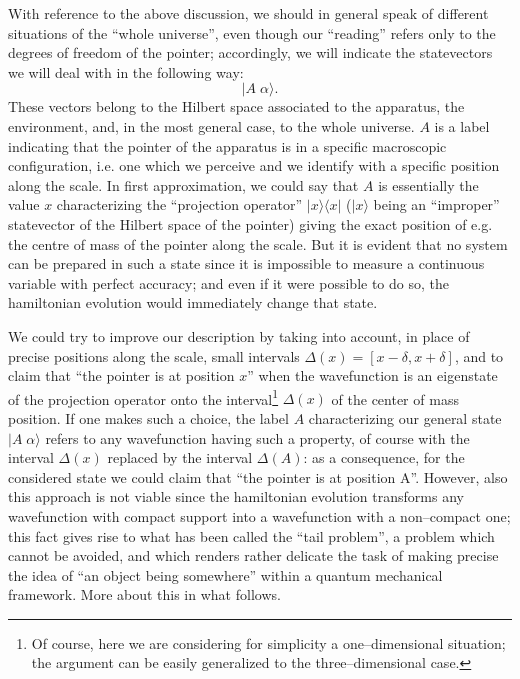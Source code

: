 \documentclass[10pt,a4paper]{article}
\begin{document}
With reference to the above discussion, we should in general speak
of different situations of the ``whole universe'', even though our
``reading'' refers only to the degrees of freedom of the  pointer;
accordingly, we will indicate the statevectors we will deal with
in the following way:
\[
        |A\; \alpha\rangle.
\]
These vectors belong to the Hilbert space  associated to the
apparatus,  the environment, and, in the most general case, to the
whole universe. $A$ is a label indicating that the pointer of the
apparatus is in a specific macroscopic configuration, i.e. one
which we perceive and we identify with a  specific position along
the scale. In first  approximation, we could say that $A$ is
essentially the value $x$  characterizing the ``projection
operator'' $|x\rangle\langle x|$ ($|x\rangle$ being an
``improper'' statevector of the Hilbert space of the pointer)
giving the exact  position of e.g. the centre of mass of the
pointer along the scale. But it is evident that no system  can be
prepared in such a state since it is impossible to measure a
continuous variable with perfect accuracy; and even if it were
possible to do so, the hamiltonian evolution would immediately
change that state.

We could try to improve our description by taking into account, in
place of precise positions along the scale, small intervals
$\Delta(x) = [ x - \delta, x + \delta ]$, and to claim that ``the
pointer is at position $x$'' when the wavefunction is an
eigenstate of the projection operator onto the
interval\footnote{Of course, here we are considering for
simplicity a one--dimensional situation; the argument can be
easily generalized to the three--dimensional case.} $\Delta(x)$ of
the center  of mass position. If one makes such a choice, the
label $A$ characterizing our general state $|A\; \alpha\rangle$
refers to any wavefunction having  such a property, of course with
the interval $\Delta(x)$ replaced by the interval $\Delta(A)$: as
a consequence, for the considered state we could claim that ``the
pointer is at position A''. However, also this approach is not
viable since the hamiltonian evolution transforms any wavefunction
with compact support into a wavefunction with a non--compact one;
this fact gives rise to what has been called the ``tail problem'',
a problem which cannot be avoided, and which  renders rather
delicate the task of making precise the idea of ``an object being
somewhere'' within a quantum mechanical framework. More about this
in what follows.
\end{document}
